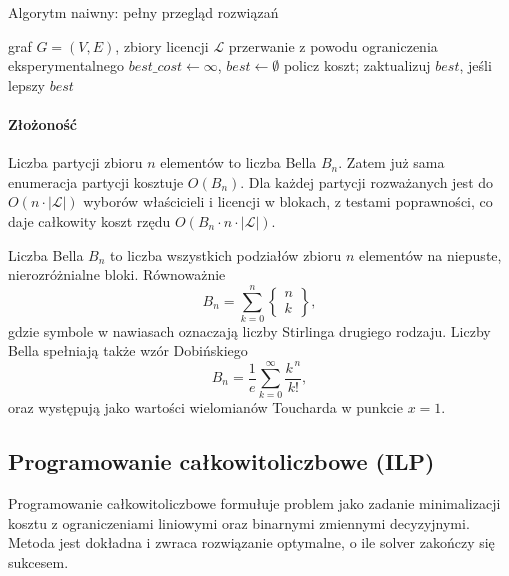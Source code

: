 \begin{algorithm}[H]
  \caption{Algorytm naiwny: pełny przegląd rozwiązań}
  \label{alg:naive}
  \begin{algorithmic}[1]
    \Require graf \(G=(V,E)\), zbiory licencji \(\mathcal{L}\)
     \State \Return przerwanie z powodu ograniczenia eksperymentalnego \EndIf
    \State \(best\_cost \gets \infty\), \(best \gets \emptyset\)
    \State policz koszt; zaktualizuj \(best\), jeśli lepszy
    \EndIf
    \EndFor
    \EndFor
    \State \Return \(best\)
  \end{algorithmic}
\end{algorithm}

\paragraph{Złożoność}
Liczba partycji zbioru \(n\) elementów to liczba Bella \(B_n\). Zatem już sama enumeracja partycji kosztuje \(O(B_n)\). Dla każdej partycji rozważanych jest do \(O(n \cdot |\mathcal{L}|)\) wyborów właścicieli i licencji w blokach, z testami poprawności, co daje całkowity koszt rzędu \(O(B_n \cdot n \cdot |\mathcal{L}|)\).

Liczba Bella \(B_n\) to liczba wszystkich podziałów zbioru \(n\) elementów na niepuste, nierozróżnialne bloki. Równoważnie
\[
  B_n = \sum_{k=0}^{n} \left\{\!\!\begin{array}{c} n \\ k \end{array}\!\!\right\},
\]
gdzie symbole w nawiasach oznaczają liczby Stirlinga drugiego rodzaju. Liczby Bella spełniają także wzór Dobińskiego
\[
  B_n = \frac{1}{e}\sum_{k=0}^{\infty}\frac{k^{\,n}}{k!},
\]
oraz występują jako wartości wielomianów Toucharda w punkcie \(x=1\).

\subsection{Programowanie całkowitoliczbowe (ILP)}\label{subsec:ilp}

Programowanie całkowitoliczbowe formułuje problem jako zadanie minimalizacji kosztu z ograniczeniami liniowymi oraz binarnymi zmiennymi decyzyjnymi. Metoda jest dokładna i zwraca rozwiązanie optymalne, o ile solver zakończy się sukcesem.

